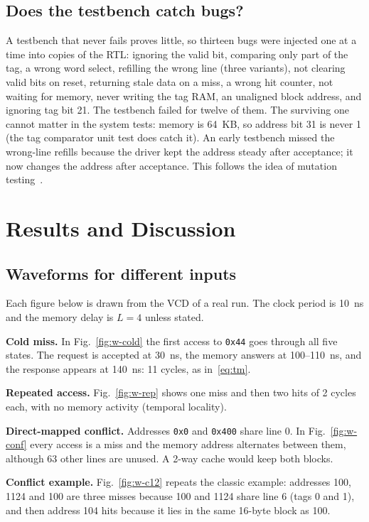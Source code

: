 \documentclass[conference]{IEEEtran}
\begin{document}
\subsection{Does the testbench catch bugs?}
A testbench that never fails proves little, so thirteen bugs were injected one at a time into copies of the RTL: ignoring the valid bit, comparing only part of the tag, a wrong word select, refilling the wrong line (three variants), not clearing valid bits on reset, returning stale data on a miss, a wrong hit counter, not waiting for memory, never writing the tag RAM, an unaligned block address, and ignoring tag bit 21. The testbench failed for twelve of them. The surviving one cannot matter in the system tests: memory is 64~KB, so address bit 31 is never 1 (the tag comparator unit test does catch it). An early testbench missed the wrong-line refills because the driver kept the address steady after acceptance; it now changes the address after acceptance. This follows the idea of mutation testing~\cite{demillo1978}.

\section{Results and Discussion}\label{sec:res}
\subsection{Waveforms for different inputs}
Each figure below is drawn from the VCD of a real run. The clock period is 10~ns and the memory delay is $L=4$ unless stated.

\textbf{Cold miss.} In Fig.~\ref{fig:w-cold} the first access to \texttt{0x44} goes through all five states. The request is accepted at 30~ns, the memory answers at 100--110~ns, and the response appears at 140~ns: 11 cycles, as in~\eqref{eq:tm}.

\textbf{Repeated access.} Fig.~\ref{fig:w-rep} shows one miss and then two hits of 2 cycles each, with no memory activity (temporal locality).

\textbf{Direct-mapped conflict.} Addresses \texttt{0x0} and \texttt{0x400} share line 0. In Fig.~\ref{fig:w-conf} every access is a miss and the memory address alternates between them, although 63 other lines are unused. A 2-way cache would keep both blocks.

\textbf{Conflict example.} Fig.~\ref{fig:w-c12} repeats the classic example: addresses 100, 1124 and 100 are three misses because 100 and 1124 share line 6 (tags 0 and 1), and then address 104 hits because it lies in the same 16-byte block as 100.
\end{document}
